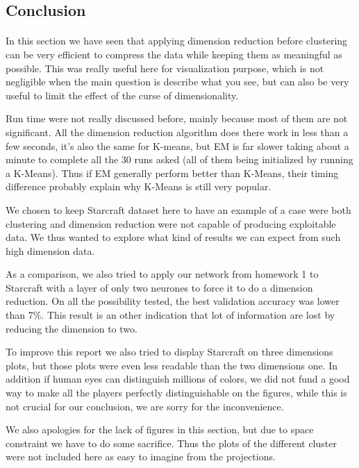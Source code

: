 \documentclass[twocolumn,a4paper,10pt]{article}
\begin{document}
\subsection{Conclusion}
\paragraph{}
In this section we have seen that applying dimension reduction before clustering can be very efficient to compress the data while keeping them as meaningful as possible. This was really useful here for visualization purpose, which is not negligible when the main question is describe what you see, but can also be very useful to limit the effect of the curse of dimensionality.

Run time were not really discussed before, mainly because most of them are not significant. All the dimension reduction algorithm does there work in less than a few seconds, it's also the same for K-means, but EM is far slower taking about a minute to complete all the 30 runs asked (all of them being initialized by running a K-Means). Thus if EM generally perform better than K-Means, their timing difference probably explain why K-Means is still very popular.

We chosen to keep Starcraft dataset here to have an example of a case were both clustering and dimension reduction were not capable of producing exploitable data. We thus wanted to explore what kind of results we can expect from such high dimension data.

As a comparison, we also tried to apply our network from homework 1 to Starcraft with a layer of only two neurones to force it to do a dimension reduction. On all the possibility tested, the best validation accuracy was lower than 7\%. This result is an other indication that lot of information are lost by reducing the dimension to two.

To improve this report we also tried to display Starcraft on three dimensions plots, but those plots were even less readable than the two dimensions one. In addition if human eyes can distinguish millions of colors, we did not fund a good way to make all the players perfectly distinguishable on the figures, while this is not crucial for our conclusion, we are sorry for the inconvenience.

We also apologies for the lack of figures in this section, but due to space constraint we have to do some sacrifice. Thus the plots of the different cluster were not included here as easy to imagine from the projections.
\end{document}

